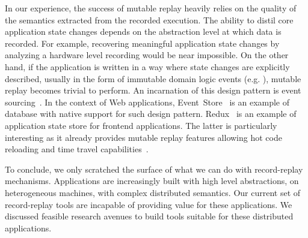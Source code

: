 In our experience, the success of mutable replay heavily relies
on the quality of the semantics extracted from the recorded execution.
The ability to distil core application state changes depends
on the abstraction level at which data is recorded. For example, recovering
meaningful application state changes by analyzing a hardware level recording
would be near impossible. On the other hand, if the application is written in a
way where state changes are explicitly described, usually in the form of
immutable domain logic events (e.g. ),
mutable replay becomes trivial to perform. An incarnation of this design pattern
is event sourcing~\cite{event-sourcing}. In the context of Web applications,
Event~Store~\cite{event-store} is an example of database with native support for
such design pattern. Redux~\cite{redux} is an example of application state
store for frontend applications. The latter is particularly interesting
as it already provides mutable replay features allowing hot code reloading and
time travel capabilities~\cite{redux-hot-reloading}.

To conclude, we only scratched the surface of what we can do with record-replay
mechanisms. Applications are increasingly built with high level abstractions, on
heterogeneous machines, with complex distributed semantics. Our current set of
record-replay tools are incapable of providing value for these applications. We
discussed feasible research avenues to build tools suitable for these
distributed applications.
